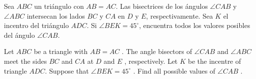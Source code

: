 Sea $ABC$ un triángulo con $AB=AC$. Las bisectrices de los ángulos $\angle CAB$ y $\angle ABC$ intersecan los lados $BC$ y $CA$ en $D$ y $E$, respectivamente. Sea $K$ el incentro del triángulo $ADC$. Si $\angle BEK=45^\circ$, encuentra todos los valores posibles del ángulo $\angle CAB$.

Let $ ABC$ be a triangle with $ AB = AC$ . The angle bisectors of $ \angle C AB$ and $ \angle AB C$ meet the sides $ B C$ and $ C A$ at $ D$ and $ E$ , respectively. Let $ K$ be the incentre of triangle $ ADC$. Suppose that $ \angle B E K = 45^\circ$ . Find all possible values of $ \angle C AB$ .